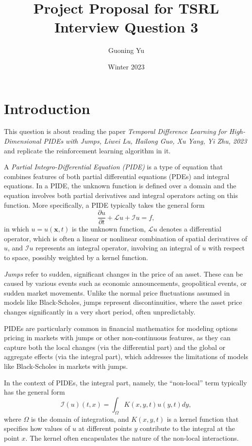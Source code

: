 \documentclass[12pt,letterpaper,oneside]{article}
\title{Project Proposal for TSRL Interview Question 3}
\author{Guoning Yu}
\date{Winter 2023}
\begin{document}
	
\baselineskip 0.6cm
\maketitle

\section{Introduction}
	This question is about reading the paper \textit{Temporal Difference Learning for High-Dimensional PIDEs with Jumps, Liwei Lu, Hailong Guo, Xu Yang, Yi Zhu, 2023} and replicate the reinforcement learning algorithm in it. 
	
	A \textit{Partial Integro-Differential Equation (PIDE)} is a type of equation that combines features of both partial differential equations (PDEs) and integral equations. In a PIDE, the unknown function is defined over a domain and the equation involves both partial derivatives and integral operators acting on this function. More specifically, a PIDE typically takes the  general form
	\begin{equation}
		\frac{\partial u}{\partial t}+\mathcal{L} u+\mathcal{I} u=f,
	\end{equation}
	in which $u = u(\textbf{x}, t)$ is the unknown function, $\mathcal{L} u$ denotes a differential operator, which is often a linear or nonlinear combination of spatial derivatives of $u$, and $\mathcal{I} u$ represents an integral operator, involving an integral of $u$ with respect to space, possibly weighted by a kernel function.
	
	\textit{Jumps} refer to sudden, significant changes in the price of an asset. These can be caused by various events such as economic announcements, geopolitical events, or sudden market movements. Unlike the normal price fluctuations assumed in models like Black-Scholes, jumps represent discontinuities, where the asset price changes significantly in a very short period, often unpredictably. 
		
	PIDEs are particularly common in financial mathematics for modeling options pricing in markets with jumps or other non-continuous features, as they can capture both the local changes (via the differential part) and the global or aggregate effects (via the integral part), which addresses the limitations of models like Black-Scholes in markets with jumps.
	
	In the context of PIDEs, the integral part, namely, the ``non-local'' term typically has the general form
	$$
	\mathcal{I}(u)(t, x)=\int_{\Omega} K(x, y, t) u(y, t) d y,
	$$
	where $\Omega$ is the domain of integration, and $K(x, y, t)$ is a kernel function that specifies how values of $u$ at different points $y$ contribute to the integral at the point $x$. The kernel often encapsulates the nature of the non-local interactions.
	
\end{document}
